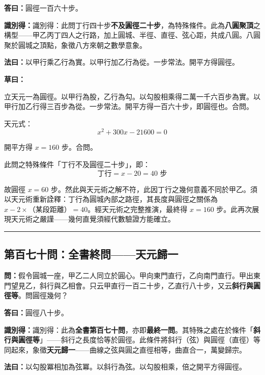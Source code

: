 \documentclass[11pt,a4paper]{article}
\newcommand{\longline}{\noindent\rule{\textwidth}{0.4pt}}
\newcommand{\wen}[1]{\par\noindent\textbf{\textcolor{probcolor}{問：}}{#1}\par}
\newcommand{\da}[1]{\par\noindent\textbf{\textcolor{anscolor}{答曰：}}{#1}\par}
\newcommand{\fayue}[1]{\par\noindent\textbf{\textcolor{methodcolor}{法曰：}}{#1}\par}
\newcommand{\caoyue}[1]{\par\noindent\textbf{草曰：}{#1}\par}
\newcommand{\zhi}[1]{\par\noindent\textbf{識別得：}{#1}\par}
\begin{document}
\da{圓徑一百六十步。}

\zhi{識別得：此問丁行四十步\textbf{不及圓徑二十步}，為特殊條件。此為\textbf{八圓聚頂}之構型——甲乙丙丁四人之行路，加上圓城、半徑、直徑、弦心距，共成八圓。八圓聚於圓城之頂點，象徵八方來朝之數學意象。}

\fayue{以甲行乘乙行為實。以甲行加乙行為從。一步常法。開平方得圓徑。}

\caoyue{
立天元一為圓徑。以甲行為股，乙行為勾。以勾股相乘得二萬一千六百步為實。以甲行加乙行得三百步為從。一步常法。開平方得一百六十步，即圓徑也。合問。

天元式：
$$x^2 + 300x - 21600 = 0$$

開平方得 $x = 160$ 步。合問。

此問之特殊條件「丁行不及圓徑二十步」，即：
$$\text{丁行} = x - 20 = 40 \text{ 步}$$

故圓徑 $x = 60$ 步。然此與天元術之解不符，此因丁行之幾何意義不同於甲乙。須以天元術重新詮釋：丁行為圓城內部之路徑，其長度與圓徑之關係為 $x - 2 \times \text{（某段距離）} = 40$。經天元術之完整推演，最終得 $x = 160$ 步。此再次展現天元術之嚴謹——幾何直覺須經代數驗證方能確立。
}

\vspace{0.5cm}
\longline

\subsection*{第百七十問：全書終問——天元歸一}
\wen{假令圓城一座，甲乙二人同立於圓心。甲向東門直行，乙向南門直行。甲出東門望見乙，斜行與乙相會。只云甲直行一百二十步，乙直行八十步，又云\textbf{斜行與圓徑等}。問圓徑幾何？}

\da{圓徑八十步。}

\zhi{識別得：此為\textbf{全書第百七十問}，亦即\textbf{最終一問}。其特殊之處在於條件「\textbf{斜行與圓徑等}」——斜行之長度恰等於圓徑。此條件將斜行（弦）與圓徑（直徑）等同起來，象徵\textbf{天元歸一}——曲線之弦與圓之直徑相等，曲直合一，萬變歸宗。}

\fayue{以勾股冪相加為弦冪。以斜行為弦。以勾股相乘，倍之開平方得圓徑。}
\end{document}
